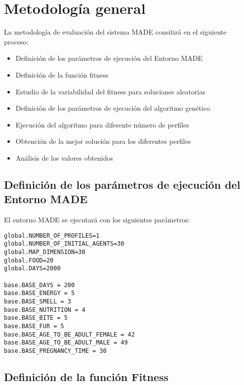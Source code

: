 



\chapter{Metodología general}
\label{cha:Overall methodology}

La metodología de evaluación del sistema MADE consitirá en el siguiente proceso:

\begin{itemize}
 \item Definición de los parámetros de ejecución del Entorno MADE
 \item Definición de la función fitness
 \item Estudio de la variabilidad del fitness para soluciones aleatorias
 \item Definición de los parámetros de ejecución del algoritmo genético
 \item Ejecución del algoritmo para diferente número de perfiles
 \item Obtención de la mejor solución para los diferentes perfiles
 \item Análisis de los valores obtenidos
\end{itemize}

\section{Definición de los parámetros de ejecución del Entorno MADE}

El entorno MADE se ejecutará con los siguientes parámetros:

\begin{verbatim}
global.NUMBER_OF_PROFILES=1
global.NUMBER_OF_INITIAL_AGENTS=30
global.MAP_DIMENSION=30
global.FOOD=20
global.DAYS=2000

base.BASE_DAYS = 200
base.BASE_ENERGY = 5
base.BASE_SMELL = 3
base.BASE_NUTRITION = 4
base.BASE_BITE = 5
base.BASE_FUR = 5
base.BASE_AGE_TO_BE_ADULT_FEMALE = 42
base.BASE_AGE_TO_BE_ADULT_MALE = 49
base.BASE_PREGNANCY_TIME = 30
\end{verbatim}

\section{Definición de la función Fitness}

